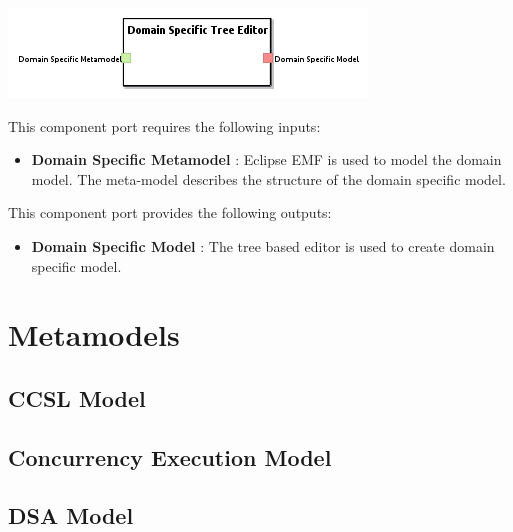 \documentclass{gemoc} %
\begin{document}
\begin{center}
\includegraphics*[trim=0.0cm 0.0cm 0cm 0.0cm, clip=true]{../images/generated/Generated_Domain_Specific_Tree_Editor.png}
\end{center}

This component port requires the following inputs:
\begin{itemize}
  \item \textbf{Domain Specific Metamodel} :
Eclipse EMF is used to model the domain model. The meta-model describes the structure of the domain specific model.
\end{itemize}

This component port provides the following outputs:
\begin{itemize}
  \item \textbf{Domain Specific Model} :
The tree based editor is used to create domain specific model.
\end{itemize}

\section{Metamodels}
\subsection{CCSL Model}


\subsection{Concurrency Execution Model}


\subsection{DSA Model}
\end{document}
